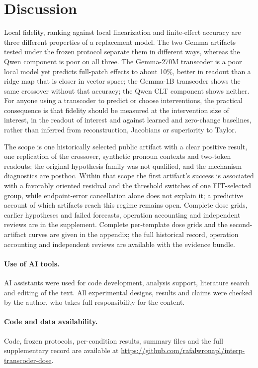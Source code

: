 \documentclass[11pt]{article}
\begin{document}
\section{Discussion}
Local fidelity, ranking against local linearization and finite-effect accuracy are three different properties of a replacement model. The two Gemma artifacts tested under the frozen protocol separate them in different ways, whereas the Qwen component is poor on all three. The Gemma-270M transcoder is a poor local model yet predicts full-patch effects to about 10\%, better in readout than a ridge map that is closer in vector space; the Gemma-1B transcoder shows the same crossover without that accuracy; the Qwen CLT component shows neither. For anyone using a transcoder to predict or choose interventions, the practical consequence is that fidelity should be measured at the intervention size of interest, in the readout of interest and against learned and zero-change baselines, rather than inferred from reconstruction, Jacobians or superiority to Taylor.

The scope is one historically selected public artifact with a clear positive result, one replication of the crossover, synthetic pronoun contexts and two-token readouts; the original hypothesis family was not qualified, and the mechanism diagnostics are posthoc. Within that scope the first artifact's success is associated with a favorably oriented residual and the threshold switches of one FIT-selected group, while endpoint-error cancellation alone does not explain it; a predictive account of which artifacts reach this regime remains open. Complete dose grids, earlier hypotheses and failed forecasts, operation accounting and independent reviews are in the supplement. Complete per-template dose grids and the second-artifact curves are given in the appendix; the full historical record, operation accounting and independent reviews are available with the evidence bundle.

\paragraph{Use of AI tools.} AI assistants were used for code development, analysis support, literature search and editing of the text. All experimental designs, results and claims were checked by the author, who takes full responsibility for the content.

\paragraph{Code and data availability.} Code, frozen protocols, per-condition results, summary files and the full supplementary record are available at \url{https://github.com/rafalwronapl/interp-transcoder-dose}.
\end{document}
